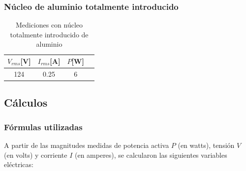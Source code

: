 \documentclass{article}
\begin{document}
            \subsubsection{Núcleo de aluminio totalmente introducido}

            \begin{table}[H]
                \centering
                \begin{tabular}{|c|c|c|c|}
                    \hline
                    $V_{rms} $[V] & $I_{rms} $[A] & $P $[W] \\ \hline
                    124           & 0.25         & 6    \\ \hline
                \end{tabular}
                \caption{Mediciones con núcleo totalmente introducido de aluminio}
                \label{tab:mediciones-nucleo-totalmente-introducido-aluminio}
            \end{table}

        \subsection{Cálculos} \label{sec:Cálculos}

            \subsubsection*{Fórmulas utilizadas}

            A partir de las magnitudes medidas de potencia activa $P$ (en watts), 
            tensión $V$ (en volts) y corriente $I$ (en amperes), se calcularon las 
            siguientes variables eléctricas:
\end{document}
